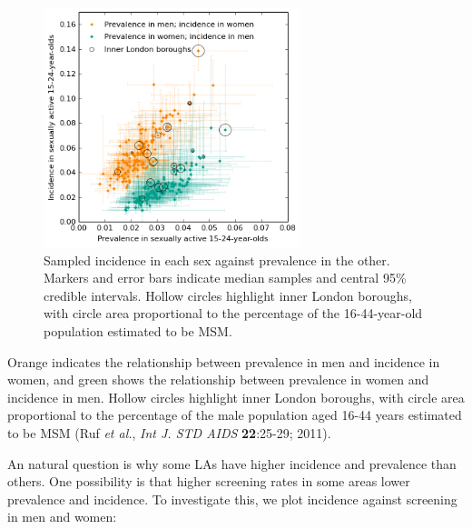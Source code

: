 \documentclass{article}
\begin{document}
    \begin{figure}
        \begin{center}\includegraphics[width=7.5cm]{local_authorities_files/local_authorities_34_1.png}\end{center}
        \caption{Sampled incidence in each sex against prevalence in the other. Markers and error bars indicate median samples and central 95\% credible intervals. Hollow circles highlight inner London boroughs, with circle area proportional to the percentage of the 16-44-year-old population estimated to be MSM.}
        \label{}
    \end{figure}
    
    Orange indicates the relationship between prevalence in men and
incidence in women, and green shows the relationship between prevalence
in women and incidence in men. Hollow circles highlight inner London
boroughs, with circle area proportional to the percentage of the male
population aged 16-44 years estimated to be MSM (Ruf \emph{et al.},
\emph{Int J. STD AIDS} \textbf{22}:25-29; 2011).

An natural question is why some LAs have higher incidence and prevalence
than others. One possibility is that higher screening rates in some
areas lower prevalence and incidence. To investigate this, we plot
incidence against screening in men and women:
\end{document}
